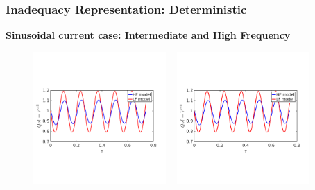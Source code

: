 \documentclass[10pt,xcolor=dvipsnames,compress]{beamer}
\begin{document}
\begin{frame}
\frametitle{Inadequacy Representation: Deterministic}
\textbf{Sinusoidal current case: Intermediate and High Frequency}

\vfill

\vspace{-0.05in}

\begin{figure}
\includegraphics[trim = 0.in  2.3in 0.in 2.8in.in, clip, width=0.45\textwidth]{figs/Isin_high_V_hf_lf.png}
~
\includegraphics[trim = 0.in  2.3in 0.in 2.8in.in, clip, width=0.45\textwidth]{figs/Isin_high_V_hf_lf.png}
\end{figure}

\vspace{-0.18in}


\end{frame}
\end{document}
